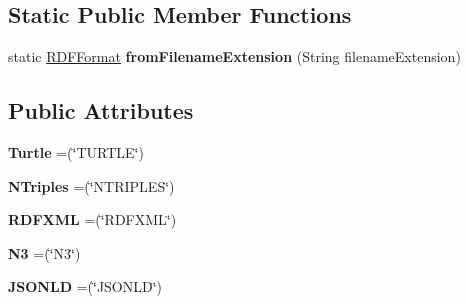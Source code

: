 \subsection*{Static Public Member Functions}
\begin{DoxyCompactItemize}
\item 
\mbox{\label{enumeu_1_1h2020_1_1symbiote_1_1core_1_1internal_1_1RDFFormat_a3aeb67ec0107bc086b9cf39548cdf464}} 
static \hyperlink{enumeu_1_1h2020_1_1symbiote_1_1core_1_1internal_1_1RDFFormat}{R\+D\+F\+Format} {\bfseries from\+Filename\+Extension} (String filename\+Extension)
\end{DoxyCompactItemize}
\subsection*{Public Attributes}
\begin{DoxyCompactItemize}
\item 
\mbox{\label{enumeu_1_1h2020_1_1symbiote_1_1core_1_1internal_1_1RDFFormat_a7fd9ddcca8b84b97f3547aa61c3d2629}} 
{\bfseries Turtle} =(\char`\"{}T\+U\+R\+T\+LE\char`\"{})
\item 
\mbox{\label{enumeu_1_1h2020_1_1symbiote_1_1core_1_1internal_1_1RDFFormat_a8ddd3d6a0651e5b9c8c4379ed0c22f85}} 
{\bfseries N\+Triples} =(\char`\"{}N\+T\+R\+I\+P\+L\+ES\char`\"{})
\item 
\mbox{\label{enumeu_1_1h2020_1_1symbiote_1_1core_1_1internal_1_1RDFFormat_a22b6845a5da763a77fdc21988b3cb0fc}} 
{\bfseries R\+D\+F\+X\+ML} =(\char`\"{}R\+D\+F\+X\+ML\char`\"{})
\item 
\mbox{\label{enumeu_1_1h2020_1_1symbiote_1_1core_1_1internal_1_1RDFFormat_abe7fc28f8ee03a4bdc026eb118ce0b01}} 
{\bfseries N3} =(\char`\"{}N3\char`\"{})
\item 
\mbox{\label{enumeu_1_1h2020_1_1symbiote_1_1core_1_1internal_1_1RDFFormat_a71e1064e7e10750997c14ed630da627a}} 
{\bfseries J\+S\+O\+N\+LD} =(\char`\"{}J\+S\+O\+N\+LD\char`\"{})
\end{DoxyCompactItemize}


